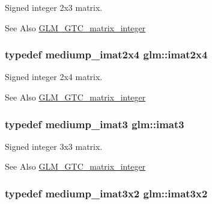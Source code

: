 Signed integer 2x3 matrix. \begin{DoxySeeAlso}{See Also}
\hyperlink{group__gtc__matrix__integer}{G\-L\-M\-\_\-\-G\-T\-C\-\_\-matrix\-\_\-integer} 
\end{DoxySeeAlso}
\hypertarget{group__gtc__matrix__integer_gafe2d058e164fd1badace451ffcf4ae46}{
\subsubsection[{imat2x4}]{\setlength{\rightskip}{0pt plus 5cm}typedef mediump\-\_\-imat2x4 {\bf glm\-::imat2x4}}}\label{group__gtc__matrix__integer_gafe2d058e164fd1badace451ffcf4ae46}
Signed integer 2x4 matrix. \begin{DoxySeeAlso}{See Also}
\hyperlink{group__gtc__matrix__integer}{G\-L\-M\-\_\-\-G\-T\-C\-\_\-matrix\-\_\-integer} 
\end{DoxySeeAlso}
\hypertarget{group__gtc__matrix__integer_ga45481922dd07a3a8e23758286311ee97}{
\subsubsection[{imat3}]{\setlength{\rightskip}{0pt plus 5cm}typedef mediump\-\_\-imat3 {\bf glm\-::imat3}}}\label{group__gtc__matrix__integer_ga45481922dd07a3a8e23758286311ee97}
Signed integer 3x3 matrix. \begin{DoxySeeAlso}{See Also}
\hyperlink{group__gtc__matrix__integer}{G\-L\-M\-\_\-\-G\-T\-C\-\_\-matrix\-\_\-integer} 
\end{DoxySeeAlso}
\hypertarget{group__gtc__matrix__integer_ga04deef94cdfdd3b3b2706e10a32ef7f3}{
\subsubsection[{imat3x2}]{\setlength{\rightskip}{0pt plus 5cm}typedef mediump\-\_\-imat3x2 {\bf glm\-::imat3x2}}}\label{group__gtc__matrix__integer_ga04deef94cdfdd3b3b2706e10a32ef7f3}
